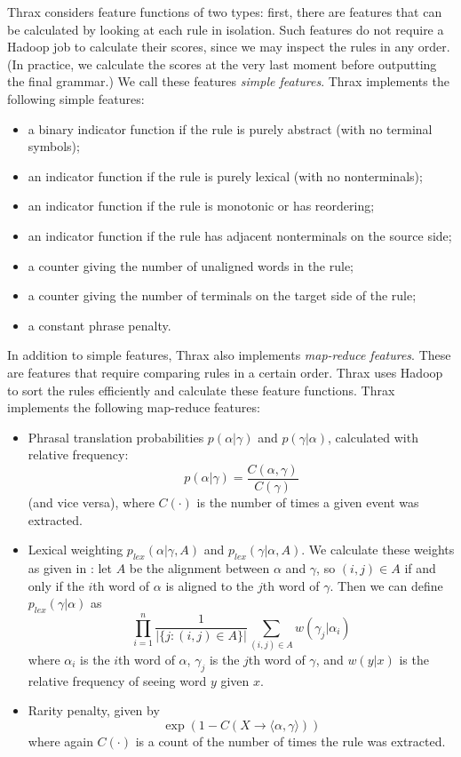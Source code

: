 \documentclass[11pt]{article}
\begin{document}
Thrax considers feature functions of two types: first, there are features that can be calculated by looking at each rule in isolation. Such features do not require a Hadoop job to calculate their scores, since we may inspect the rules in any order. (In practice, we calculate the scores at the very last moment before outputting the final grammar.) We call these features {\em simple features}. Thrax implements the following simple features:
\begin{itemize}
\item a binary indicator function if the rule is purely abstract (with no terminal symbols);
\item an indicator function if the rule is purely lexical (with no nonterminals);
\item an indicator function if the rule is monotonic or has reordering;
\item an indicator function if the rule has adjacent nonterminals on the source side;
\item a counter giving the number of unaligned words in the rule;
\item a counter giving the number of terminals on the target side of the rule;
\item a constant phrase penalty.
\end{itemize}
In addition to simple features, Thrax also implements {\em map-reduce features}. These are features that require comparing rules in a certain order. Thrax uses Hadoop to sort the rules efficiently and calculate these feature functions. Thrax implements the following map-reduce features:
\begin{itemize}
\item Phrasal translation probabilities $p(\alpha|\gamma)$ and
  $p(\gamma|\alpha)$, calculated with relative frequency:
\begin{equation}
p(\alpha|\gamma) = \frac{C(\alpha,\gamma)}{C(\gamma)}
\end{equation}
(and vice versa), where $C(\cdot)$ is the number of times a given
event was extracted.
\item Lexical weighting $p_{\textit{lex}}(\alpha|\gamma,A)$ and $p_{\textit{lex}}(\gamma|\alpha,A)$. We calculate these weights as given in \cite{koehn2003}: let $A$ be the alignment between $\alpha$ and $\gamma$, so $(i,j) \in A$ if and only if the $i$th word of $\alpha$ is aligned to the $j$th word of $\gamma$. Then we can define $p_{\textit{lex}}(\gamma|\alpha)$ as
\begin{equation}
\prod_{i=1}^n{\frac{1}{|\{j : (i,j) \in A\}|}\sum_{(i,j) \in A}{w(\gamma_j|\alpha_i)}}
\end{equation}
where $\alpha_i$ is the $i$th word of $\alpha$, $\gamma_j$ is the
$j$th word of $\gamma$, and $w(y|x)$ is the relative frequency of
seeing word $y$ given $x$. 
\item Rarity penalty, given by
\begin{equation}
\exp(1 - C(X \to \langle \alpha , \gamma \rangle))
\end{equation}
where again $C(\cdot)$ is a count of the number of times the rule was extracted.
\end{itemize}
\end{document}
